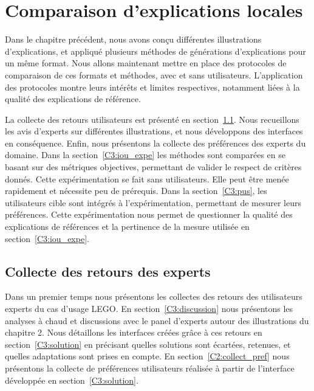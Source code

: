 \chapter[Comparaison d'explications locales]{Comparaison d'explications locales} \label{C3}


Dans le chapitre précédent, nous avons conçu différentes illustrations d'explications, et appliqué plusieurs méthodes de générations d'explications pour un même format. Nous allons maintenant mettre en place des protocoles de comparaison de ces formats et méthodes, avec et sans utilisateurs.
L'application des protocoles montre leurs intérêts et limites respectives, notamment liées à la qualité des explications de référence.

La collecte des retours utilisateurs est présenté en section~\ref{C3:test_u}. Nous recueillons les avis d'experts sur différentes illustrations, et nous développons des interfaces en conséquence. Enfin, nous présentons la collecte des préférences des experts du domaine.
Dans la section~\ref{C3:iou_expe} les méthodes sont comparées en se basant sur des métriques objectives, permettant de valider le respect de critères donnés. Cette expérimentation se fait sans utilisateurs.
Elle peut être menée rapidement et nécessite peu de prérequis.
Dans la section~\ref{C3:pus}, les utilisateurs cible sont intégrés à l'expérimentation, permettant de mesurer leurs préférences. Cette expérimentation nous permet de questionner la qualité des explications de références et la pertinence de la mesure utilisée en section~\ref{C3:iou_expe}.

\section{Collecte des retours des experts} \label{C3:test_u}
Dans un premier temps nous présentons les collectes des retours des utilisateurs experts du cas d'usage LEGO.
En section~\ref{C3:discussion} nous présentons les analyses à chaud et discussions avec le panel d'experts autour des illustrations du chapitre 2.
Nous détaillons les interfaces créées grâce à ces retours en section~\ref{C3:solution} en précisant quelles solutions sont écartées, retenues, et quelles adaptations sont prises en compte.
En section~\ref{C2:collect_pref} nous présentons la collecte de préférences utilisateurs réalisée à partir de l'interface développée en section~\ref{C3:solution}.

